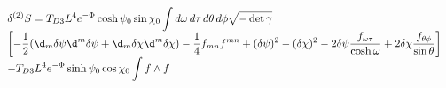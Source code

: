 \begin{equation}
\label{quadNS}
\begin{array}{l}
\displaystyle\delta^{(2)}S = T_{D3}L^4e^{-\Phi}\cosh\psi_0\sin\chi_0
             \int d\omega\,d\tau\,d\theta\,d\phi\sqrt{-\det\gamma}\\
\displaystyle\left[
  -\frac{1}{2}(\d_m\delta\psi\d^m\delta\psi + \d_m\delta\chi\d^m\delta\chi)
  -\frac{1}{4}f_{mn}f^{mn} +(\delta\psi)^2 -(\delta\chi)^2
  -2\delta\psi\frac{f_{\omega\tau}}{\cosh\omega}
  +2\delta\chi\frac{f_{\theta\phi}}{\sin\theta} \right] \\
\displaystyle-T_{D3}L^4e^{-\Phi}\sinh\psi_0\cos\chi_0\int f\wedge f
\end{array}
\end{equation}

